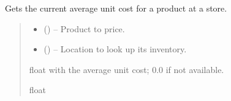 \documentclass[a4paper,11pt,spanish]{sphinxmanual}
\begin{document}
\begin{fulllineitems}
\label{\detokenize{api/sale/sale.services:sale.services.price_from_inventory}}
\pysigstartsignatures
\pysiglinewithargsret
{}
{\sphinxparamcomma {}}
{}
\pysigstopsignatures
\sphinxAtStartPar
Gets the current average unit cost for a product at a store.
\begin{quote}\begin{description}
\begin{itemize}
\item {} 
\sphinxAtStartPar
{} () – Product to price.

\item {} 
\sphinxAtStartPar
{} ({\hyperref[\detokenize{api/inventory/inventory.models:inventory.models.Location}]{}}) – Location to look up its inventory.

\end{itemize}

\sphinxAtStartPar
float with the average unit cost; 0.0 if not available.

\sphinxAtStartPar
float

\end{description}\end{quote}

\end{fulllineitems}

\end{document}
